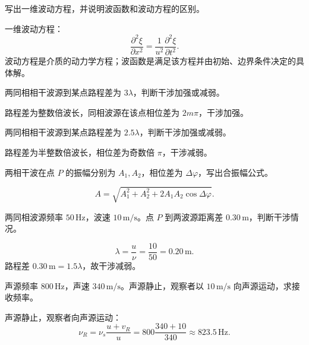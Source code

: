 \begin{exercise}[level=standard]
写出一维波动方程，并说明波函数和波动方程的区别。
\begin{solution}
一维波动方程：
\[
  \frac{\partial^2 \xi}{\partial x^2}
  =\frac1{u^2}\frac{\partial^2 \xi}{\partial t^2}.
\]
波动方程是介质的动力学方程；波函数是满足该方程并由初始、边界条件决定的具体解。
\end{solution}
\end{exercise}

\begin{exercise}[level=standard]
两同相相干波源到某点路程差为 $3\lambda$，判断干涉加强或减弱。
\begin{solution}
路程差为整数倍波长，同相波源在该点相位差为 $2m\pi$，干涉加强。
\end{solution}
\end{exercise}

\begin{exercise}[level=standard]
两同相相干波源到某点路程差为 $2.5\lambda$，判断干涉加强或减弱。
\begin{solution}
路程差为半整数倍波长，相位差为奇数倍 $\pi$，干涉减弱。
\end{solution}
\end{exercise}

\begin{exercise}[level=standard]
两相干波在点 $P$ 的振幅分别为 $A_1,A_2$，相位差为 $\Delta\varphi$，写出合振幅公式。
\begin{solution}
\[
  A=\sqrt{A_1^2+A_2^2+2A_1A_2\cos\Delta\varphi}.
\]
\end{solution}
\end{exercise}

\begin{exercise}[level=standard]
两同相波源频率 $50\,\mathrm{Hz}$，波速 $10\,\mathrm{m/s}$。点 $P$ 到两波源距离差 $0.30\,\mathrm{m}$，判断干涉情况。
\begin{solution}
\[
  \lambda=\frac{u}{\nu}=\frac{10}{50}=0.20\,\mathrm{m}.
\]
路程差 $0.30\,\mathrm{m}=1.5\lambda$，故干涉减弱。
\end{solution}
\end{exercise}

\begin{exercise}[level=standard]
声源频率 $800\,\mathrm{Hz}$，声速 $340\,\mathrm{m/s}$。声源静止，观察者以 $10\,\mathrm{m/s}$ 向声源运动，求接收频率。
\begin{solution}
声源静止，观察者向声源运动：
\[
  \nu_R=\nu_s\frac{u+v_R}{u}
  =800\frac{340+10}{340}\approx823.5\,\mathrm{Hz}.
\]
\end{solution}
\end{exercise}

